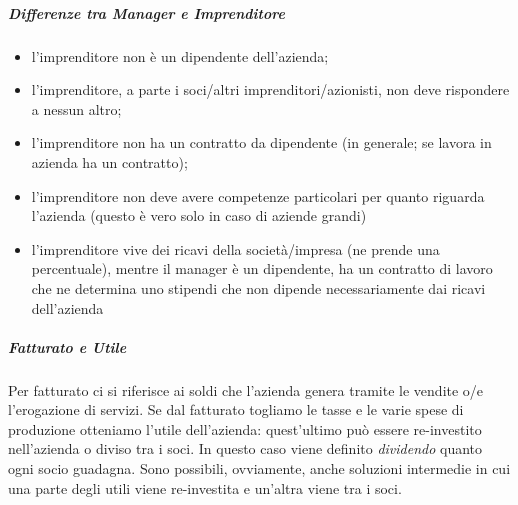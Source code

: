 \subparagraph*{Differenze tra Manager e Imprenditore}
\begin{itemize}
  \item l'imprenditore non è un dipendente dell'azienda;
  \item l'imprenditore, a parte i soci/altri imprenditori/azionisti, non deve
rispondere a nessun altro;
  \item l'imprenditore non ha un contratto da dipendente (in generale; se 
  lavora in azienda ha un contratto);
  \item l'imprenditore non deve avere competenze particolari per quanto riguarda
l'azienda (questo è vero solo in caso di aziende grandi)
  \item l'imprenditore vive dei ricavi della società/impresa (ne prende una
percentuale), mentre il manager è un dipendente, ha un contratto di lavoro che
ne determina uno stipendi che non dipende necessariamente dai ricavi
dell'azienda\\[0.5cm] 
\end{itemize}

\subparagraph*{Fatturato e Utile} Per fatturato ci si riferisce ai soldi che
l'azienda genera tramite le vendite o/e l'erogazione di servizi. Se dal
fatturato togliamo le tasse e le varie spese di produzione otteniamo l'utile
dell'azienda: quest'ultimo può essere re-investito nell'azienda o diviso tra
i soci. In questo caso viene definito \textit{dividendo} quanto ogni socio
guadagna. Sono possibili, ovviamente, anche soluzioni intermedie in cui una
parte degli utili viene re-investita e un'altra viene tra i soci.
